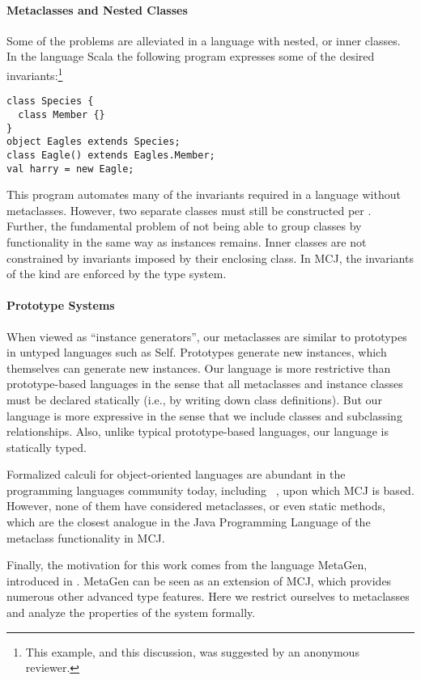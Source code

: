 \documentclass[nocopyrightspace,10pt]{acm-sigplan}
\begin{document}
\paragraph{Metaclasses and Nested Classes}
Some of the problems are alleviated in a language with nested, or
inner classes.  In the language Scala \cite{Scala} the following
program expresses some of the desired invariants:\footnote{This
  example, and this discussion, was suggested by an anonymous
  reviewer.}


\begin{verbatim}
class Species {
  class Member {}
}
object Eagles extends Species;
class Eagle() extends Eagles.Member;
val harry = new Eagle;
\end{verbatim}

This program automates many of the invariants required in a language
without metaclasses.  However, two separate classes must still be
constructed per .  Further, the fundamental problem of
not being able to group classes by functionality in the same way as
instances remains.  Inner classes are not constrained by
invariants imposed by their enclosing class.  In MCJ, the invariants of the
kind are enforced by the type system.  

\paragraph{Prototype Systems}
When viewed as ``instance generators'', our metaclasses are similar to
prototypes in untyped languages such as Self.  Prototypes generate new
instances, which themselves can generate new instances.  Our language
is more restrictive than prototype-based languages in the sense that
all metaclasses and instance classes must be declared statically
(i.e., by writing down class definitions).  But our language is more
expressive in the sense that we include classes and subclassing
relationships.  Also, unlike typical prototype-based languages, our
language is statically typed.

Formalized calculi for object-oriented languages are abundant in the
programming languages community today, including \FJ\ \cite{FJ}, upon
which MCJ is based.  However, none of them have considered
metaclasses, or even static methods, which are the closest analogue in
the Java Programming Language of the metaclass functionality in MCJ.

Finally, the motivation for this work comes from the language MetaGen,
introduced in \cite{DimUnits}.  MetaGen can be seen as an extension of
MCJ, which provides numerous other advanced type features.  Here we
restrict ourselves to metaclasses and analyze the properties of the
system formally.
\end{document}
